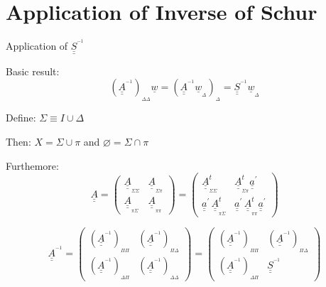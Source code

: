 \documentclass[handout]{beamer}
\newcommand{\Matriz}[1]{\underline{\underline{#1}}}
\newcommand{\InvMatriz}[1]{{\underline{\underline{#1}}}^{^{-1}}}
\newcommand{\InvSchur}{\Matriz{S}^{^{-1}}}
\newcommand{\Vector}[1]{\underline{#1}}
\newcommand{\VectorD}[1]{\underline{#1}_{_\Delta}}
\newcommand{\SubScript}[1]{_{_{#1}}}
\begin{document}
\section{Application of Inverse of Schur}

\begin{frame}{Application of $\InvSchur$}

Basic result:
\[
(\InvMatriz{A})\SubScript{\Delta \Delta} \Vector{w} = \left(\InvMatriz{A} \Vector{w}\SubScript{\Delta} \right)\SubScript{\Delta} = \InvSchur \VectorD{w}
\]

Define: $\Sigma \equiv I \cup \Delta$

Then: $X = \Sigma \cup \pi$ and $\varnothing = \Sigma \cap \pi$

Furthemore:
\[
\Matriz{A} = 
\left(
\begin{array}{cc}
\Matriz{A}\SubScript{\Sigma \Sigma} & \Matriz{A}\SubScript{\Sigma \pi} \\
\Matriz{A}\SubScript{\pi \Sigma} & \Matriz{A}\SubScript{\pi \pi}
\end{array}
\right) = 
\left(
\begin{array}{cc}
\Matriz{A}\SubScript{\Sigma \Sigma}^{t} & \Matriz{A}\SubScript{\Sigma \pi}^{t} \Matriz{a}^\prime\\
\Matriz{a}^\prime \, \Matriz{A}\SubScript{\pi \Sigma}^{t} & \Matriz{a}^\prime \, \Matriz{A}\SubScript{\pi \pi}^{t}\Matriz{a}^\prime
\end{array}
\right)
\]

\[
\InvMatriz{A} = 
\left(
\begin{array}{cc}
(\InvMatriz{A})\SubScript{\Pi \Pi} & (\InvMatriz{A})\SubScript{\Pi \Delta} \\
(\InvMatriz{A})\SubScript{\Delta \Pi} & (\InvMatriz{A})\SubScript{\Delta \Delta}
\end{array}
\right) = 
\left(
\begin{array}{cc}
(\InvMatriz{A})\SubScript{\Pi \Pi} & (\InvMatriz{A})\SubScript{\Pi \Delta} \\
(\InvMatriz{A})\SubScript{\Delta \Pi} & \InvSchur
\end{array}
\right)
\]
\end{frame}
\end{document}
